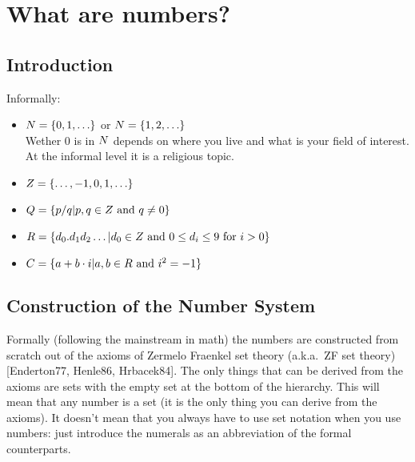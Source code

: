 \section{What are numbers?}

\subsection{Introduction}

Informally:
\begin{itemize}
  \item $N = \{0,1,\ldots\}$ or $N = \{1,2,\ldots\}$ \\
  Wether $0$ is in $N$ depends on where you live and what is your field
  of interest. At the informal level it is a religious topic.
  \item $Z = \{\ldots,-1,0,1,\ldots\}$
  \item $Q = \{p/q | p, q \in Z \mbox{ and } q \neq 0\}$
  \item $R = \{d_0.d_1d_2\ldots | d_0 \in Z \mbox{ and } 0 \leq d_i
  \leq 9 \mbox{ for } i>0\}$
  \item $C = \{a+b \cdot i | a, b \in R \mbox{ and } i^2 = -1\}$
\end{itemize}

\subsection{Construction of the Number System}


Formally (following the mainstream in math) the numbers are constructed
from scratch out of the axioms of Zermelo Fraenkel set theory (a.k.a.\
ZF set theory) [Enderton77, Henle86, Hrbacek84]. The only things that
can be derived from the axioms are sets with the empty set at the bottom
of the hierarchy.  This will mean that any number is a set (it is the
only thing you can derive from the axioms). It doesn't mean that you
always have to use set notation when you use numbers: just introduce the
numerals as an abbreviation of the formal counterparts.



